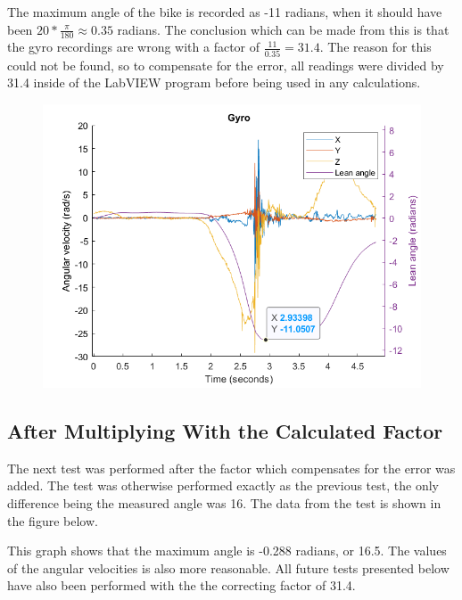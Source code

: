 The maximum angle of the bike is recorded as -11 radians, when it should have been $20 * \frac{\pi}{180} \approx 0.35$ radians. The conclusion which can be made from this is that the gyro recordings are wrong with a factor of $\frac{11}{0.35} = 31.4$. The reason for this could not be found, so to compensate for the error, all readings were divided by 31.4 inside of the LabVIEW program before being used in any calculations.

\begin{figure}[h]
    \centering
    \includegraphics[width=\textwidth]{figure/gyroAngleTestWrong.png}
\end{figure}

\newpage

\subsection{After Multiplying With the Calculated Factor}

The next test was performed after the factor which compensates for the error was added. The test was otherwise performed exactly as the previous test, the only difference being the measured angle was 16\degree. The data from the test is shown in the figure below.

This graph shows that the maximum angle is -0.288 radians, or 16.5\degree. The values of the angular velocities is also more reasonable. All future tests presented below have also been performed with the the correcting factor of 31.4.


